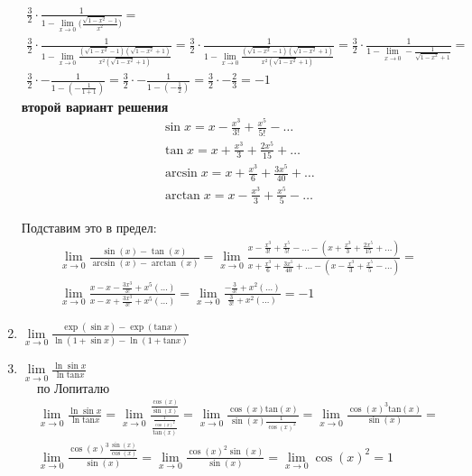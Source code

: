 \begin{enumerate}
\begin{gather*}
				\frac{3}{2} \cdot \frac{1}{1 - \lim \limits_{x \to 0} \bigg(\frac{\sqrt{1 - x^2} - 1}{x^2} \bigg)} = \\
				\frac{3}{2} \cdot \frac{1}{1 - \lim \limits_{x \to 0} \frac{(\sqrt{1 - x^2} - 1)(\sqrt{1 - x^2} + 1)}{x^2(\sqrt{1 - x^2} + 1)}} = 
				\frac{3}{2} \cdot \frac{1}{1 - \lim \limits_{x \to 0} \frac{(\sqrt{1 - x^2} - 1)(\sqrt{1 - x^2} + 1)}{x^2(\sqrt{1 - x^2} + 1)}} = 
				\frac{3}{2} \cdot \frac{1}{1 - \lim \limits_{x \to 0} - \frac{1}{\sqrt{1 - x^2} + 1}} = \\
				\frac{3}{2} \cdot - \frac{1}{1 - ( - \frac{1}{1 + 1})} = 
				\frac{3}{2} \cdot - \frac{1}{1 - ( - \frac{1}{2})} = 
				\frac{3}{2} \cdot - \frac{2}{3} = 
				 - 1 
			\end{gather*}
			\textbf{второй вариант решения}\\
			\begin{gather*}
				\sin x = x - \frac{x^{3}}{3!} + \frac{x^{5}}{5!} - \ldots\\
				\tan x = x + \frac{x^{3}}{3} + \frac{2x^{5}}{15} + \ldots\\
				\arcsin x = x + \frac{x^{3}}{6} + \frac{3x^{5}}{40} + \ldots\\
				\arctan x = x - \frac{x^{3}}{3} + \frac{x^{5}}{5} - \ldots
			\end{gather*}
			
			Подставим это в предел:\\
			\begin{gather*}
				\lim\limits_{x \to 0}\frac{\sin(x) - \tan(x)}{\arcsin(x) - \arctan(x)} = 
				\lim\limits_{x \to 0}\frac{x - \frac{x^{3}}{3!} + \frac{x^{5}}{5!} - \ldots - (x + \frac{x^{3}}{3} + \frac{2x^{5}}{15} + \ldots)}{x + \frac{x^{3}}{6} + \frac{3x^{5}}{40} + \ldots - (x - \frac{x^{3}}{3} + \frac{x^{5}}{5} - \ldots)} = \\
				\lim\limits_{x \to 0}\frac{x - x - \frac{3x^{3}}{3!} + x^5(\ldots)}{x - x + \frac{3x^{3}}{3!} + x^5(\ldots)} = 
				\lim\limits_{x \to 0}\frac{ - \frac{3}{3!} + x^2(\ldots)}{\frac{3}{3!} + x^2(\ldots)} = - 1
			\end{gather*}
			
		\item $\lim \limits_{x \to 0} \frac{\exp (\sin x) - \exp (\text{tan} x)}{\ln (1 + \sin x) - \ln (1 + \text{tan} x)}$
		
		\item $\lim \limits_{x \to 0} \frac{\ln \sin x}{\ln \text{tan} x}$
			\begin{gather*}
				\text{по Лопиталю}\\
				\lim \limits_{x \to 0} \frac{\ln \sin x}{\ln \text{tan} x} = 
				\lim \limits_{x \to 0} \frac{\frac{\cos(x)}{\sin(x)}}{\frac{\frac{1}{\cos(x)^2}}{\text{tan}(x)}} = 
				\lim \limits_{x \to 0} \frac{\cos(x) \text{tan}(x)}{\sin(x) \frac{1}{\cos(x)^2}} = 
				\lim \limits_{x \to 0} \frac{\cos(x)^3 \text{tan}(x)}{\sin(x)} = \\
				\lim \limits_{x \to 0} \frac{\cos(x)^3 \frac{\sin(x)}{\cos(x)}}{\sin(x)} = 
				\lim \limits_{x \to 0} \frac{\cos(x)^2 \sin(x)}{\sin(x)} = 
				\lim \limits_{x \to 0} \cos(x)^2 = 1
			\end{gather*}
		

\end{enumerate}
